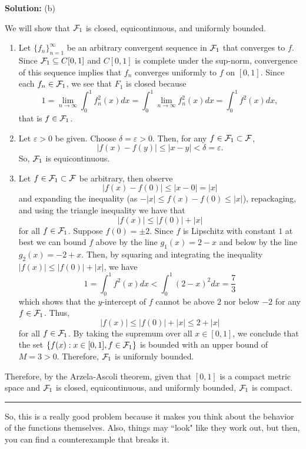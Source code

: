 \documentclass{article}
\begin{document}
\textbf{Solution:} (b) 

We will show that $\mathcal F_1$ is closed, equicontinuous, and uniformly bounded.

\begin{enumerate}
	\item Let $\{f_n\}_{n=1}^\infty$ be an arbitrary convergent sequence in $\mathcal F_1$ that converges to $f$. Since 
		$\mathcal F_1\subseteq C[0,1]$ and $C[0,1]$ is complete under the sup-norm, convergence of this sequence 
		implies that $f_n$ converges uniformly to $f$ on $[0,1]$. Since each $f_n\in \mathcal F_1$, we see that $F_1$ is
		 closed because
			\[ 1 = \lim_{n\to\infty} \int_0^1 f_n^2(x) dx = \int_0^1 \lim_{n\to\infty} f_n^2(x) dx = \int_0^1 f^2(x) dx,\]
		that is $f\in \mathcal F_1$. 
	\item Let $\varepsilon>0$ be given. Choose $\delta = \varepsilon > 0$. Then, for any $f\in \mathcal F_1 \subset \mathcal F$, 
		\[ |f(x) - f(y)| \leq |x-y| < \delta = \varepsilon.\]
		So, $\mathcal F_1$ is equicontinuous.
		
	\item Let $f\in \mathcal F_1\subset \mathcal F$ be arbitrary, then observe
			\[ |f(x) - f(0)| \leq |x-0| = |x|\]
		and expanding the inequality (as $-|x| \leq f(x) - f(0) \leq |x|$), repackaging, and using the triangle inequality
		 we have that 
			\[|f(x)| \leq |f(0)| + |x|\]
		for all $f\in \mathcal F_1$. Suppose $f(0) = \pm 2$. Since $f$ is Lipschitz with constant $1$ at best we can bound $f$
		above by the line $g_1(x) = 2-x$ and below by the line $g_2(x) = -2+x$. Then, by squaring and integrating 
		the inequality $|f(x)| \leq |f(0)| + |x|$, we have
		 	\[ 1 = \int_0^1 f^2(x) dx < \int_0^1(2-x)^2 dx = \frac{7}{3}\]
		which shows that the $y$-intercept of $f$ cannot be above $2$ nor below $-2$ for any $f\in \mathcal F_1$.
		Thus, 
			\[|f(x)| \leq |f(0)| + |x| \leq 2 + |x|\]
		for all $f\in \mathcal F_1$. By taking the supremum over all $x\in [0,1]$, we conclude that the set
		 $\{f(x) : x\in [0,1], f\in\mathcal F_1\}$ is bounded with an upper bound of $M = 3 > 0$. Therefore, $\mathcal F_1$ is uniformly bounded.
\end{enumerate}
	
	Therefore, by the Arzela-Ascoli theorem, given that $[0,1]$ is a compact metric space and $\mathcal F_1$ is closed, 
	equicontinuous, and uniformly bounded, $\mathcal F_1$ is compact. \\
	
\hrule

So, this is a really good problem because it makes you think about the behavior of the functions themselves. Also, things may ``look" like they work out, but then, you can find a counterexample that breaks it. 
\end{document}
